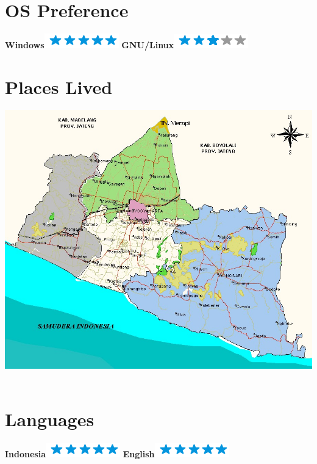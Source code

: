 \documentclass[]{friggeri-cv}
\begin{document}
\begin{aside}
~
~
~
  \section{OS Preference}
	\textbf{Windows}\includegraphics[scale=0.40]{img/5stars.png}
    \textbf{GNU/Linux}\includegraphics[scale=0.40]{img/3stars.png}
    ~
  \section{Places Lived}
    \includegraphics[scale=0.1]{img/peta_diy.jpg}
    ~
  \section{Languages}
    \textbf{Indonesia}\includegraphics[scale=0.40]{img/5stars.png}
    \textbf{English}\includegraphics[scale=0.40]{img/5stars.png}
    ~
\end{aside}
\end{document}
